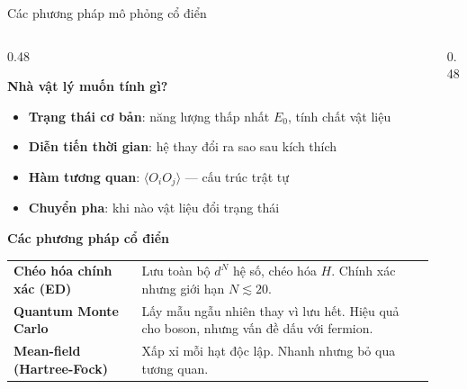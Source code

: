 \documentclass[aspectratio=169, 11pt]{beamer}
\newcommand{\warn}[1]{\textcolor{qamber}{#1}}
\begin{document}
\begin{frame}[shrink=3]{Các phương pháp mô phỏng cổ điển}

\begin{columns}[T]
\begin{column}{0.48\textwidth}

\textcolor{qcyan}{\textbf{Nhà vật lý muốn tính gì?}}\\[3pt]
{\small
\begin{itemize}
  \item \textbf{Trạng thái cơ bản}: năng lượng thấp nhất $E_0$, tính chất vật liệu
  \item \textbf{Diễn tiến thời gian}: hệ thay đổi ra sao sau kích thích
  \item \textbf{Hàm tương quan}: $\langle O_i O_j \rangle$ — cấu trúc trật tự
  \item \textbf{Chuyển pha}: khi nào vật liệu đổi trạng thái
\end{itemize}}

\vspace{6pt}
\textcolor{qpurple}{\textbf{Các phương pháp cổ điển}}

\vspace{4pt}
{\small
\renewcommand{\arraystretch}{1.3}
\begin{tabular}{@{}p{2.1cm}@{\;}p{4.2cm}@{}}
\textbf{Chéo hóa chính xác (ED)} & Lưu toàn bộ $d^N$ hệ số, chéo hóa $H$. Chính xác nhưng \warn{giới hạn $N \lesssim 20$}. \\
\textbf{Quantum Monte Carlo} & Lấy mẫu ngẫu nhiên thay vì lưu hết. Hiệu quả cho boson, nhưng \warn{vấn đề dấu} với fermion. \\
\textbf{Mean-field (Hartree-Fock)} & Xấp xỉ mỗi hạt độc lập. Nhanh nhưng \warn{bỏ qua tương quan}. \\
\end{tabular}}

\end{column}
\begin{column}{0.48\textwidth}

\vspace{2pt}
\begin{center}
\end{center}
\end{column}
\end{columns}
\end{frame}
\end{document}

